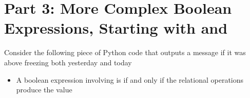 \documentclass[letterpaper,10pt,english]{sphinxmanual}
\begin{document}
\section{Part 3: More Complex Boolean Expressions, Starting with and}
\label{\detokenize{lecture_notes/lec06_conditionals1:part-3-more-complex-boolean-expressions-starting-with-and}}
Consider the following piece of Python code that outputs a message if
it was above freezing both yesterday and today
\begin{quote}

%
\begin{sphinxVerbatim}[commandchars=\\\{\}]
  
  
       
\end{sphinxVerbatim}
\end{quote}
\begin{itemize}
\item {} 
A boolean expression involving  is  if and only if
 the relational operations produce the value 

\end{itemize}
\end{document}
